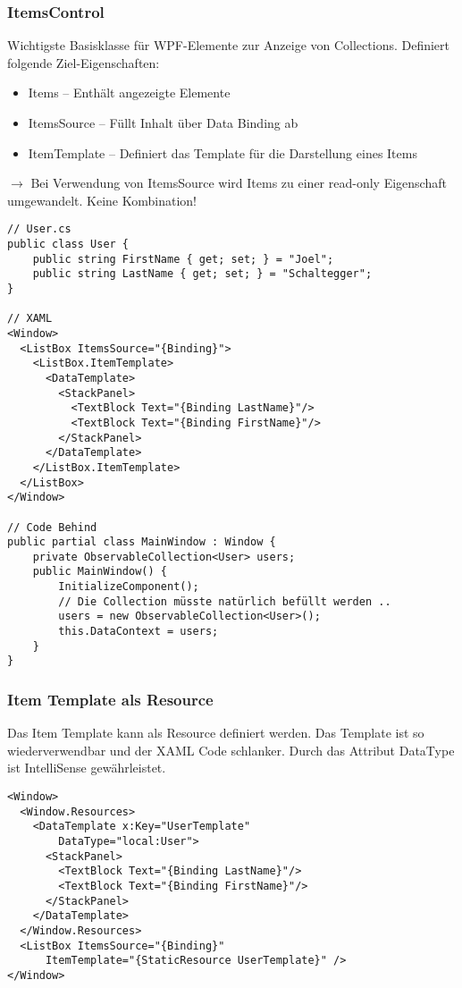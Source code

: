 \subsubsection{ItemsControl}
Wichtigste Basisklasse für WPF-Elemente zur Anzeige von Collections. Definiert folgende Ziel-Eigenschaften:
\begin{itemize}[topsep=0pt, leftmargin=4mm]
    \setlength\itemsep{-0.3em}
    \item Items – Enthält angezeigte Elemente
    \item ItemsSource – Füllt Inhalt über Data Binding ab
    \item ItemTemplate – Definiert das Template für die Darstellung eines Items
\end{itemize}
$\rightarrow$ Bei Verwendung von ItemsSource wird Items zu einer read-only Eigenschaft umgewandelt. Keine Kombination!
\begin{lstlisting}
// User.cs
public class User {
    public string FirstName { get; set; } = "Joel";
    public string LastName { get; set; } = "Schaltegger";
}

// XAML
<Window>
  <ListBox ItemsSource="{Binding}">
    <ListBox.ItemTemplate>
      <DataTemplate>
        <StackPanel>
          <TextBlock Text="{Binding LastName}"/>
          <TextBlock Text="{Binding FirstName}"/>
        </StackPanel>
      </DataTemplate>
    </ListBox.ItemTemplate>
  </ListBox>
</Window>

// Code Behind
public partial class MainWindow : Window {
    private ObservableCollection<User> users;
    public MainWindow() {
        InitializeComponent();
        // Die Collection müsste natürlich befüllt werden ..
        users = new ObservableCollection<User>();
        this.DataContext = users;
    }
}
\end{lstlisting}
\subsubsection{Item Template als Resource}
Das Item Template kann als Resource definiert werden. Das Template ist so wiederverwendbar und der XAML Code schlanker. Durch das Attribut DataType ist IntelliSense gewährleistet.
\begin{lstlisting}
<Window>
  <Window.Resources>
    <DataTemplate x:Key="UserTemplate"
        DataType="local:User">
      <StackPanel>
        <TextBlock Text="{Binding LastName}"/>
        <TextBlock Text="{Binding FirstName}"/>
      </StackPanel>
    </DataTemplate>
  </Window.Resources>
  <ListBox ItemsSource="{Binding}"
      ItemTemplate="{StaticResource UserTemplate}" />
</Window>
\end{lstlisting}
